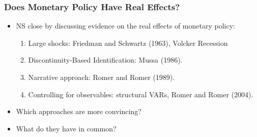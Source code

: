 \documentclass[english,xcolor=svgnames]{beamer}
\begin{document}
%
%


\begin{frame}
\frametitle[alignment=center]{Does Monetary Policy Have Real Effects?}
\begin{itemize}
	\item NS close by discussing evidence on the real effects of monetary policy:
	\begin{enumerate}
		\item Large shocks: Friedman and Schwartz (1963), Volcker Recession
		\item Discontinuity-Based Identification: Mussa (1986).
		\item Narrative approach: Romer and Romer (1989).
		\item Controlling for observables: structural VARs, Romer and Romer (2004).
	\end{enumerate}
	\item Which approaches are more convincing?
	\item What do they have in common?
\end{itemize}
\end{frame}
\end{document}
